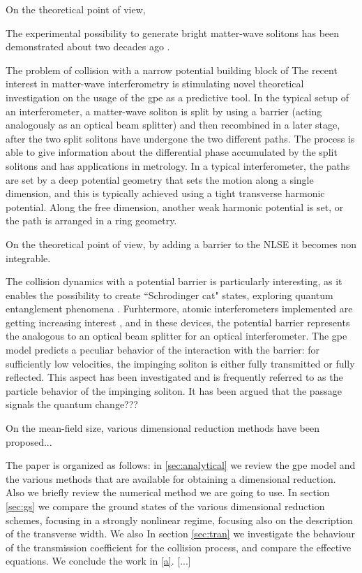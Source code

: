 \documentclass[pra,twocolumn]{revtex4-2}
\begin{document}
  On the theoretical point of view,  

  The experimental possibility to generate bright matter-wave solitons has been demonstrated about two decades ago \cite{khaykovich-formation}. \cite{triaxial}

  The problem of collision with a narrow potential building block of 
  The recent interest in matter-wave interferometry is stimulating novel theoretical investigation on the usage of the \gls{gpe} as a predictive tool. 
  In the typical setup of an interferometer, a matter-wave soliton is split by using a barrier (acting analogously as an optical beam splitter) and then recombined in a later stage, after the two split solitons have undergone the two different paths. The process is able to give information about the differential phase accumulated by the split solitons and has applications in metrology. In a typical interferometer, the paths are set by a deep potential geometry that sets the motion along a single dimension, and this is typically achieved using a tight transverse harmonic potential. Along the free dimension, another weak harmonic potential is set, or the path is arranged in a ring geometry.

  On the theoretical point of view, by adding a barrier to the NLSE it becomes non integrable.

  The collision dynamics with a potential barrier is particularly interesting, as it enables the possibility to create ``Schrodinger cat" states, exploring quantum entanglement phenomena \cite{gertj,gertjerenkengenerating2013}.
  Furhtermore, atomic interferometers implemented are getting increasing interest \cite{helm,cuevas-interactions-2013}, and in these devices, the potential barrier represents the analogous to an optical beam splitter for an optical interferometer.
  The \gls{gpe} model predicts a peculiar behavior of the interaction with the barrier: for sufficiently low velocities, the impinging soliton is either fully transmitted or fully reflected. 
  This aspect has been investigated \cite{gertjerenkengenerating2013} and is frequently referred to as the particle behavior of the impinging soliton. It has been argued that the passage signals the quantum change???

  On the mean-field size, various dimensional reduction methods have been proposed...

  The paper is organized as follows: in \ref{sec:analytical} we review the \gls{gpe} model and the various methods that are available for obtaining a dimensional reduction. Also we briefly review the numerical method we are going to use.
  In section \ref{sec:gs} we compare the ground states of the various dimensional reduction schemes, focusing in a strongly nonlinear regime, focusing also on the description of the transverse width. We also
  In section \ref{sec:tran} we investigate the behaviour of the transmission coefficient for the collision process, and compare the effective equations. We conclude the work in \ref{a}. [...]
\end{document}

